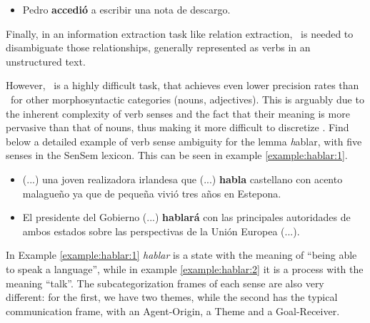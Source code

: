 \begin{example}\label{example:acceder:2}
  \begin{itemize}
    \item Pedro {\bf accedi\'o} a escribir una nota de descargo.
  \end{itemize}
\end{example}

Finally, in an information extraction task like relation extraction, \vsd~is
needed to disambiguate those relationships, generally represented as verbs in
an unstructured text.

However, \vsd~is a highly difficult task, that achieves even lower precision
rates than \wsd~for other morphosyntactic categories (nouns, adjectives). This
is arguably due to the inherent complexity of verb senses and the fact that
their meaning is more pervasive than that of nouns, thus making it more
difficult to discretize \cite{chen2009improving}. Find below a detailed example
of verb sense ambiguity for the lemma {\emph hablar}, with five senses in the
SenSem lexicon. This can be seen in example \ref{example:hablar:1}.

\begin{example}\label{example:hablar:1}
  \begin{itemize}
    \item (...) una joven realizadora irlandesa que (...) {\bf habla}
      castellano con acento malague\~no ya que de peque\~na vivi\'o tres a\~nos
      en Estepona.
  \end{itemize}
\end{example}

\begin{example}\label{example:hablar:2}
  \begin{itemize}
    \item El presidente del Gobierno (...) {\bf hablar\'a} con las principales
      autoridades de ambos estados sobre las perspectivas de la Uni\'on Europea
      (...).
  \end{itemize}
\end{example}

In Example \ref{example:hablar:1} {\it hablar} is a state with the meaning of
``being able to speak a language'', while in example \ref{example:hablar:2} it
is a process with the meaning ``talk''. The subcategorization frames of each
sense are also very different: for the first, we have two themes, while the
second has the typical communication frame, with an Agent-Origin, a Theme and a
Goal-Receiver.

